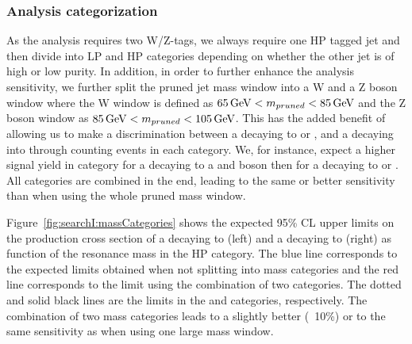 \subsubsection{Analysis categorization}
As the analysis requires two W/Z-tags, we always require one HP tagged jet and then divide into LP and HP categories depending on whether the other jet is of high or low purity. In addition, in order to further enhance the analysis sensitivity, we further split the pruned jet mass window into a W and a Z boson window where the W window is defined as $65 {\,\text{Ge\hspace{-.08em}V}} < m_{pruned} < 85 {\,\text{Ge\hspace{-.08em}V}}$ and the Z boson window as $85 {\,\text{Ge\hspace{-.08em}V}} < m_{pruned} < 105 {\,\text{Ge\hspace{-.08em}V}}$. This has the added benefit of allowing us to make a discrimination between a \BulkG decaying to \WW or \ZZ, and a \PWpr decaying into \WZ through counting events in each category. We, for instance, expect a higher signal yield in \WZ category for a \PWpr decaying to a \PW and \PZ boson then for a \BulkG decaying to \WW or \ZZ. All categories are combined in the end, leading to the same or better sensitivity than when using the whole pruned mass window. 

Figure~\ref{fig:searchI:massCategories} shows the expected 95\% CL upper limits on the production cross section of a \PWpr decaying to \WZ (left) and a \BulkG decaying to \WW (right) as function of the resonance mass in the HP category. The blue line corresponds to the expected limits obtained when not splitting into mass categories and the red line corresponds to the limit using the combination of two categories. The dotted and solid black lines are the limits in the \PW and \PZ categories, respectively. The combination of two mass categories leads to a slightly better (~10\%) or to the same sensitivity as when using one large mass window.

